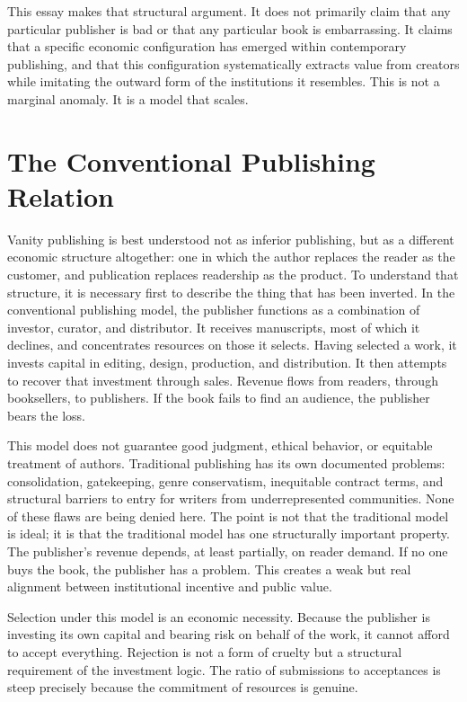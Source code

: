 \documentclass[12pt, a4paper]{article}
\begin{document}
This essay makes that structural argument. It does not primarily claim that any particular publisher is bad or that any particular book is embarrassing. It claims that a specific economic configuration has emerged within contemporary publishing, and that this configuration systematically extracts value from creators while imitating the outward form of the institutions it resembles. This is not a marginal anomaly. It is a model that scales.

\section{The Conventional Publishing Relation}

Vanity publishing is best understood not as inferior publishing, but as a different economic structure altogether: one in which the author replaces the reader as the customer, and publication replaces readership as the product. To understand that structure, it is necessary first to describe the thing that has been inverted. In the conventional publishing model, the publisher functions as a combination of investor, curator, and distributor. It receives manuscripts, most of which it declines, and concentrates resources on those it selects. Having selected a work, it invests capital in editing, design, production, and distribution. It then attempts to recover that investment through sales. Revenue flows from readers, through booksellers, to publishers. If the book fails to find an audience, the publisher bears the loss.

This model does not guarantee good judgment, ethical behavior, or equitable treatment of authors. Traditional publishing has its own documented problems: consolidation, gatekeeping, genre conservatism, inequitable contract terms, and structural barriers to entry for writers from underrepresented communities. None of these flaws are being denied here. The point is not that the traditional model is ideal; it is that the traditional model has one structurally important property. The publisher's revenue depends, at least partially, on reader demand. If no one buys the book, the publisher has a problem. This creates a weak but real alignment between institutional incentive and public value.

Selection under this model is an economic necessity. Because the publisher is investing its own capital and bearing risk on behalf of the work, it cannot afford to accept everything. Rejection is not a form of cruelty but a structural requirement of the investment logic. The ratio of submissions to acceptances is steep precisely because the commitment of resources is genuine.
\end{document}
